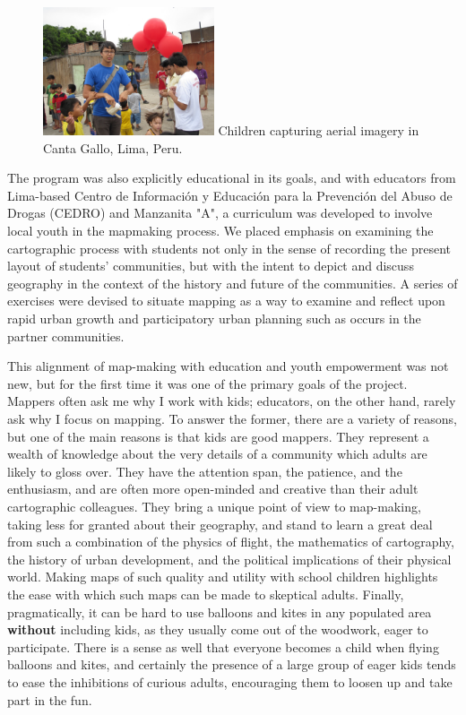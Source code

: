 \documentclass[11pt]{report}
\begin{document}
\begin{figure}
	\begin{flushright}
		\includegraphics[width=0.45\textwidth]{images/kids-canta-gallo.jpg}
		Children capturing aerial imagery in Canta Gallo, Lima, Peru.
	\end{flushright}
\end{figure}

The program was also explicitly educational in its goals, and with educators from Lima-based Centro de Información y Educación para la Prevención del Abuso de Drogas (CEDRO) and Manzanita "A", a curriculum was developed to involve local youth in the mapmaking process. We placed emphasis on examining the cartographic process with students not only in the sense of recording the present layout of students' communities, but with the intent to depict and discuss geography in the context of the history and future of the communities. A series of exercises were devised to situate mapping as a way to examine and reflect upon rapid urban growth and participatory urban planning such as occurs in the partner communities.

This alignment of map-making with education and youth empowerment was not new, but for the first time it was one of the primary goals of the project. Mappers often ask me why I work with kids; educators, on the other hand, rarely ask why I focus on mapping. To answer the former, there are a variety of reasons, but one of the main reasons is that kids are good mappers. They represent a wealth of knowledge about the very details of a community which adults are likely to gloss over. They have the attention span, the patience, and the enthusiasm, and are often more open-minded and creative than their adult cartographic colleagues. They bring a unique point of view to map-making, taking less for granted about their geography, and stand to learn a great deal from such a combination of the physics of flight, the mathematics of cartography, the history of urban development, and the political implications of their physical world. Making maps of such quality and utility with school children highlights the ease with which such maps can be made to skeptical adults. Finally, pragmatically, it can be hard to use balloons and kites in any populated area \textbf{without} including kids, as they usually come out of the woodwork, eager to participate. There is a sense as well that everyone becomes a child when flying balloons and kites, and certainly the presence of a large group of eager kids tends to ease the inhibitions of curious adults, encouraging them to loosen up and take part in the fun. 
\end{document}
